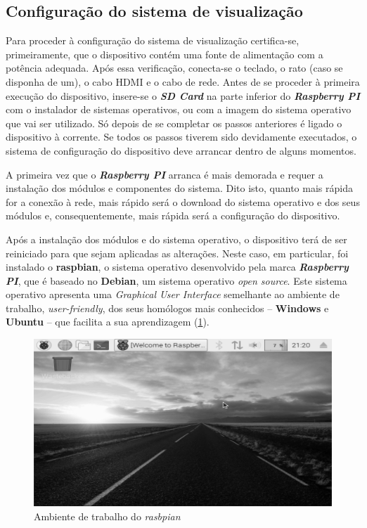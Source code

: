 \subsection{Configuração do sistema de visualização}

\hspace{1cm}Para proceder à configuração do sistema de visualização certifica-se, primeiramente, que o dispositivo contém uma fonte de alimentação com a potência adequada. Após essa verificação, conecta-se o teclado, o rato (caso se disponha de um), o cabo HDMI e o cabo de rede. Antes de se proceder à primeira execução do dispositivo, insere-se o \textbf{\textit{SD Card}} na parte inferior do \textbf{\textit{Raspberry PI}} com o instalador de sistemas operativos, ou com a imagem do sistema operativo que vai ser utilizado. Só depois de se completar os passos anteriores é ligado o dispositivo à corrente. Se todos os passos tiverem sido devidamente executados, o sistema de configuração do dispositivo deve arrancar dentro de alguns momentos.

\hspace{1cm}A primeira vez que o \textbf{\textit{Raspberry PI}} arranca é mais demorada e requer a instalação dos módulos e componentes do sistema. Dito isto, quanto mais rápida for a conexão à rede, mais rápido será o download do sistema operativo e dos seus módulos e, consequentemente, mais rápida será a configuração do dispositivo.


\hspace{1cm}Após a instalação dos módulos e do sistema operativo, o dispositivo terá de ser reiniciado para que sejam aplicadas as alterações. Neste caso, em particular, foi instalado o \textbf{raspbian}, o sistema operativo desenvolvido pela marca \textbf{\textit{Raspberry PI}}, que é baseado no \textbf{Debian}, um sistema operativo \textit{open source}. Este sistema operativo apresenta uma \textit{Graphical User Interface} semelhante ao ambiente de trabalho, \textit{user-friendly}, dos seus homólogos mais conhecidos -- \textbf{Windows} e \textbf{Ubuntu} -- que facilita a sua aprendizagem (\ref{Fig:Fig4}).

\begin{figure}
\centering
\includegraphics[width=0.5\linewidth]{Cap8/RaspberryPiWorkEnvironment.png}
\caption{Ambiente de trabalho do \textit{rasbpian}}
\label{Fig:Fig4}
\end{figure}

